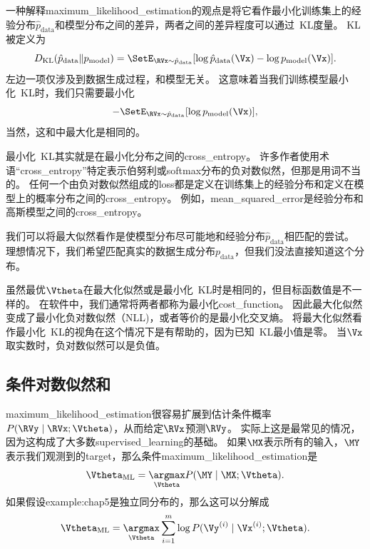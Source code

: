 一种解释\gls{maximum_likelihood_estimation}的观点是将它看作最小化训练集上的经验分布$\hat{p}_{\text{data}}$和模型分布之间的差异，两者之间的差异程度可以通过~\gls{KL}度量。
\gls{KL}被定义为
\begin{equation}
    D_{\text{KL}}(\hat{p}_{\text{data}} \| p_{\text{model}}) = \SetE_{\RVx \sim \hat{p}_{\text{data}}} [ \log \hat{p}_{\text{data}}(\Vx) - \log p_{\text{model}}(\Vx) ] .
\end{equation}
左边一项仅涉及到数据生成过程，和模型无关。
这意味着当我们训练模型最小化~\gls{KL}时，我们只需要最小化
\begin{equation}
    -\SetE_{\RVx \sim \hat{p}_{\text{data}}} [ \log p_{\text{model}}(\Vx)  ] ,
\end{equation}
当然，这和中最大化是相同的。


最小化~\gls{KL}其实就是在最小化分布之间的\gls{cross_entropy}。
许多作者使用术语``\gls{cross_entropy}''特定表示伯努利或softmax分布的负对数似然，但那是用词不当的。
任何一个由负对数似然组成的\gls{loss}都是定义在训练集上的经验分布和定义在模型上的概率分布之间的\gls{cross_entropy}。
例如，\gls{mean_squared_error}是经验分布和高斯模型之间的\gls{cross_entropy}。

我们可以将最大似然看作是使模型分布尽可能地和经验分布$\hat{p}_{\text{data}}$相匹配的尝试。
理想情况下，我们希望匹配真实的数据生成分布$p_{\text{data}}$，但我们没法直接知道这个分布。

虽然最优$\Vtheta$在最大化似然或是最小化~\gls{KL}时是相同的，但目标函数值是不一样的。
在软件中，我们通常将两者都称为最小化\gls{cost_function}。
因此最大化似然变成了最小化负对数似然（NLL)，或者等价的是最小化交叉熵。
将最大化似然看作最小化~\gls{KL}的视角在这个情况下是有帮助的，因为已知~\gls{KL}最小值是零。
当$\Vx$取实数时，负对数似然可以是负值。

\subsection{条件对数似然和}
\label{sec:conditional_log_likelihood_and_mean_squared_error}
\gls{maximum_likelihood_estimation}很容易扩展到估计条件概率$P(\RVy \mid \RVx;\Vtheta)$，从而给定$\RVx$预测$\RVy$。
实际上这是最常见的情况，因为这构成了大多数\gls{supervised_learning}的基础。
如果$\MX$表示所有的输入，$\MY$表示我们观测到的\gls{target}，那么条件\gls{maximum_likelihood_estimation}是
\begin{equation}
    \Vtheta_{\text{ML}} = \underset{\Vtheta}{\argmax} P(\MY \mid \MX; \Vtheta).
\end{equation}
如果假设\gls{example:chap5}是独立同分布的，那么这可以分解成
\begin{equation}
\label{eq:5.63}
    \Vtheta_{\text{ML}} = \underset{\Vtheta}{\argmax} \sum_{i=1}^m \log P(\Vy^{(i)} \mid \Vx^{(i)}; \Vtheta).
\end{equation}

